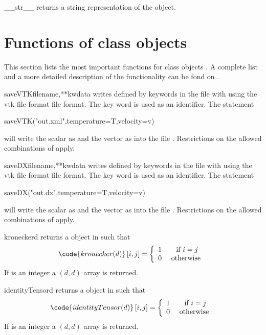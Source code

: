 \begin{methoddesc}[Data]{__str__}{}
returns a string representation of the object.
\end{methoddesc}

\section{Functions of \Data class objects}
This section lists the most important functions for \Data class objects .
A complete list and a more detailed description of the functionality can be fond on \ReferenceGuide.
\begin{funcdesc}{saveVTK}{filename,**kwdata}
writes \Data defined by keywords in the file with  using the 
vtk file format \VTK file format. The key word is used as an identifier. The statement
\begin{python}
saveVTK("out.xml",temperature=T,velocity=v)
\end{python} 
will write the scalar  as  and the vector  as   into the 
file . Restrictions on the allowed combinations of \FunctionSpace apply.
\end{funcdesc}
\begin{funcdesc}{saveDX}{filename,**kwdata}
writes \Data defined by keywords in the file with  using the 
vtk file format \OpenDX file format. The key word is used as an identifier. The statement
\begin{python}
saveDX("out.dx",temperature=T,velocity=v)
\end{python} 
will write the scalar  as  and the vector  as   into the 
file . Restrictions on the allowed combinations of \FunctionSpace apply.
\end{funcdesc}
\begin{funcdesc}{kronecker}{d}
returns a \RankTwo \Data object in \FunctionSpace {} such that
\begin{equation}
\code{kronecker(d)}\left[ i,j\right] = \left\{ 
\begin{array}{cc}
1 & \mbox{ if } i=j \\
0 & \mbox{ otherwise }
\end{array}
\right.
\end{equation}
If  is an integer a $(d,d)$ \numarray array is returned.
\end{funcdesc}
\begin{funcdesc}{identityTensor}{d}
returns a \RankTwo \Data object in \FunctionSpace {} such that
\begin{equation}
\code{identityTensor(d)}\left[ i,j\right] = \left\{ 
\begin{array}{cc}
1 & \mbox{ if } i=j \\
0 & \mbox{ otherwise }
\end{array}
\right.
\end{equation}
If  is an integer a $(d,d)$ \numarray array is returned.
\end{funcdesc}
